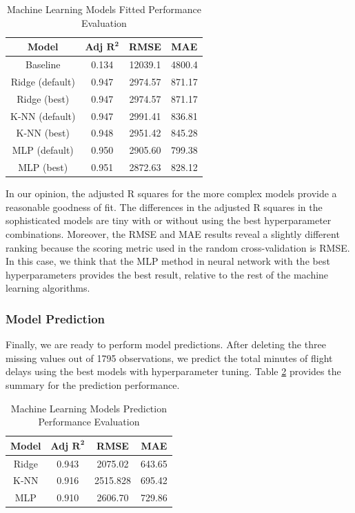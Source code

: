 \documentclass[11pt]{article}
\begin{document}
\begin{table}[h!]
\centering
\caption{Machine Learning Models Fitted Performance Evaluation} 
\label{tab:summary}
\begin{tabular}{cccc}
\toprule
\textbf{Model} & \textbf{Adj }$\textbf{R}^{\pmb{2}}$ & \textbf{RMSE} & \textbf{MAE} \\
\midrule
Baseline & 0.134 & 12039.1 & 4800.4 \\
Ridge (default) & 0.947 & 2974.57 & 871.17 \\
Ridge (best) & 0.947 & 2974.57 & 871.17 \\
K-NN (default) & 0.947 & 2991.41 & 836.81 \\ 
K-NN (best) & 0.948 & 2951.42 & 845.28 \\ 
MLP (default) & 0.950 & 2905.60 & 799.38 \\
MLP (best) & 0.951 & 2872.63 & 828.12 \\
\bottomrule
\end{tabular}%
\end{table}

In our opinion, the adjusted R squares for the more complex models provide a reasonable goodness of fit. The differences in the adjusted R squares in the sophisticated models are tiny with or without using the best hyperparameter combinations. Moreover, the RMSE and MAE results reveal a slightly different ranking because the scoring metric used in the random cross-validation is RMSE. In this case, we think that the MLP method in neural network with the best hyperparameters provides the best result, relative to the rest of the machine learning algorithms.

\subsubsection{Model Prediction}
Finally, we are ready to perform model predictions. After deleting the three missing values out of 1795 observations, we predict the total minutes of flight delays using the best models with hyperparameter tuning. Table \ref{tab:prediction} provides the summary for the prediction performance.

\begin{table}[h!]
\centering
\caption{Machine Learning Models Prediction Performance Evaluation} 
\label{tab:prediction}
\begin{tabular}{cccc}
\toprule
\textbf{Model} & \textbf{Adj }$\textbf{R}^{\pmb{2}}$ & \textbf{RMSE} & \textbf{MAE} \\
\midrule
Ridge & 0.943 & 2075.02 & 643.65 \\
K-NN & 0.916 & 2515.828 & 695.42 \\ 
MLP & 0.910 & 2606.70 & 729.86 \\
\bottomrule
\end{tabular}%
\end{table}
\end{document}
